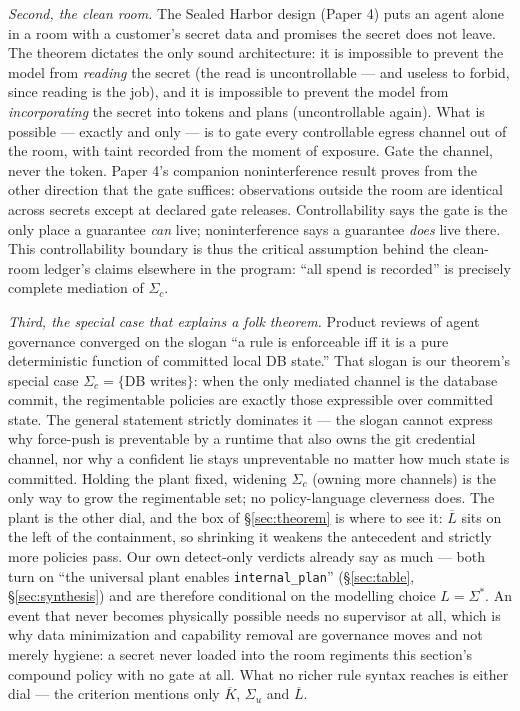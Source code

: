 \documentclass[11pt,a4paper]{article}  \usepackage{mdframed} \usepackage{graphicx}
\begin{document}
\emph{Second, the clean room.} The Sealed Harbor design (Paper 4) puts an agent alone in a room with a customer's secret data
and promises the secret does not leave. The theorem dictates the only sound architecture: it is impossible to prevent the
model from \emph{reading} the secret (the read is uncontrollable --- and useless to forbid, since reading is the job), and it
is impossible to prevent the model from \emph{incorporating} the secret into tokens and plans (uncontrollable again). What is
possible --- exactly and only --- is to gate every controllable egress channel out of the room, with taint recorded from the
moment of exposure. Gate the channel, never the token. Paper 4's companion noninterference result proves from the other
direction that the gate suffices: observations outside the room are identical across secrets except at declared gate
releases. Controllability says the gate is the only place a guarantee \emph{can} live; noninterference says a guarantee
\emph{does} live there. This controllability boundary is thus the critical assumption behind the clean-room ledger's
claims elsewhere in the program: ``all spend is recorded'' is precisely complete mediation of $\Sigma_c$.

\emph{Third, the special case that explains a folk theorem.} Product reviews of agent governance converged on the slogan ``a
rule is enforceable iff it is a pure deterministic function of committed local DB state.'' That slogan is our theorem's
special case $\Sigma_c=\{$DB writes$\}$: when the only mediated channel is the database commit, the regimentable policies are
exactly those expressible over committed state. The general statement strictly dominates it --- the slogan cannot express why
force-push is preventable by a runtime that also owns the git credential channel, nor why a confident lie stays unpreventable
no matter how much state is committed. Holding the plant fixed, widening $\Sigma_c$ (owning more channels) is the only way to
grow the regimentable set; no policy-language cleverness does. The plant is the other dial, and the box of
\S\ref{sec:theorem} is where to see it: $\overline{L}$ sits on the left of the containment, so shrinking it weakens the
antecedent and strictly more policies pass. Our own detect-only verdicts already say as much --- both turn on ``the universal
plant enables \texttt{internal\_plan}'' (\S\ref{sec:table}, \S\ref{sec:synthesis}) and are therefore conditional on the
modelling choice $L=\Sigma^*$. An event that never becomes physically possible needs no supervisor at all, which is why data
minimization and capability removal are governance moves and not merely hygiene: a secret never loaded into the room
regiments this section's compound policy with no gate at all. What no richer rule syntax reaches is either dial --- the
criterion mentions only $\overline{K}$, $\Sigma_u$ and $\overline{L}$.
\end{document}
